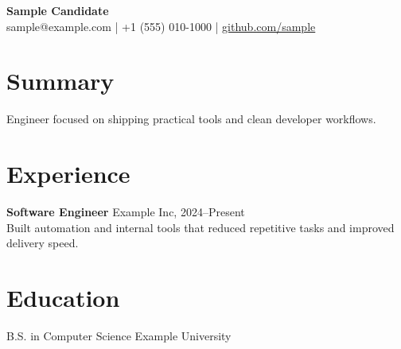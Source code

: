 \documentclass[11pt]{article}
\begin{document}
{\LARGE \textbf{Sample Candidate}} \\
sample@example.com \quad | \quad +1 (555) 010-1000 \quad | \quad \href{https://github.com/sample}{github.com/sample}

\section*{Summary}
Engineer focused on shipping practical tools and clean developer workflows.

\section*{Experience}
\textbf{Software Engineer} \hfill Example Inc, 2024--Present \\
Built automation and internal tools that reduced repetitive tasks and improved delivery speed.

\section*{Education}
B.S. in Computer Science \hfill Example University
\end{document}
